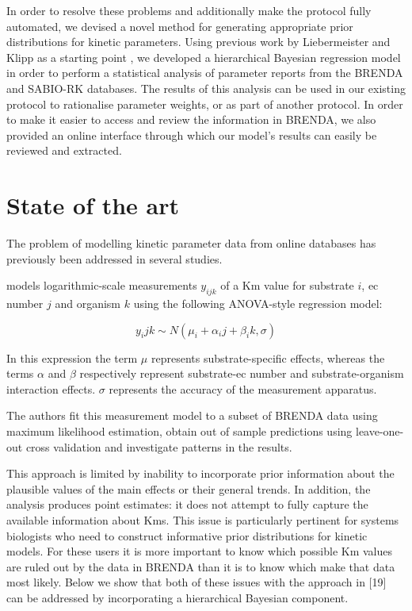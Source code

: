 \documentclass[11pt]{article}
\begin{document}
In order to resolve these problems and additionally make the protocol fully
automated, we devised a novel method for generating appropriate prior
distributions for kinetic parameters. Using previous work by Liebermeister and
Klipp as a starting point , we
developed a hierarchical Bayesian regression model in order to perform a
statistical analysis of parameter reports from the BRENDA  and SABIO-RK  databases. The results of this
analysis can be used in our existing protocol to rationalise parameter weights,
or as part of another protocol.  In order to make it easier to access and review
the information in BRENDA, we also provided an online interface through which
our model’s results can easily be reviewed and extracted.

\section{State of the art}
\label{sec:org502960c}
The problem of modelling kinetic parameter data from online databases has
previously been addressed in several studies.

 models logarithmic-scale measurements
\(y_{ijk}\) of a Km value for substrate \(i\), ec number \(j\) and organism \(k\) using
the following ANOVA-style regression model:

\begin{equation}
y_ijk \sim N(\mu_i + \alpha_ij + \beta_ik, \sigma)
\end{equation}

In this expression the term \(\mu\) represents substrate-specific effects, whereas
the terms \(\alpha\) and \(\beta\) respectively represent substrate-ec number and
substrate-organism interaction effects. \(\sigma\) represents the accuracy of the
measurement apparatus.

The authors fit this measurement model to a subset of BRENDA data using maximum
likelihood estimation, obtain out of sample predictions using leave-one-out
cross validation and investigate patterns in the results.

This approach is limited by inability to incorporate prior information about the
plausible values of the main effects or their general trends. In addition, the
analysis produces point estimates: it does not attempt to fully capture the
available information about Kms. This issue is particularly pertinent for
systems biologists who need to construct informative prior distributions for
kinetic models. For these users it is more important to know which possible Km
values are ruled out by the data in BRENDA than it is to know which make that
data most likely. Below we show that both of these issues with the approach in
[19] can be addressed by incorporating a hierarchical Bayesian component.
\end{document}
